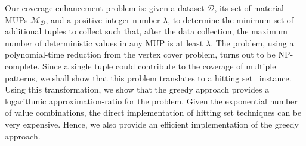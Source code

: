 Our coverage enhancement problem is: given a dataset $\mathcal{D}$, its set of material MUPs $\mathcal{M}_\mathcal{D}$, and a positive integer number $\lambda$, to determine the minimum set of additional tuples to collect such that, after the data collection, the maximum number of deterministic values in any MUP is at least $\lambda$. The problem, using a polynomial-time reduction from the vertex cover problem, turns out to be NP-complete. 
Since a single tuple could contribute to the coverage of multiple patterns, we shall show that this problem translates to a hitting set~\cite{vazirani2013approximation} instance. Using this transformation, we show that the greedy approach provides a logarithmic approximation-ratio for the problem. Given the exponential number of value combinations, the direct implementation of hitting set techniques can be very expensive. Hence, we also provide an efficient implementation of the greedy approach.